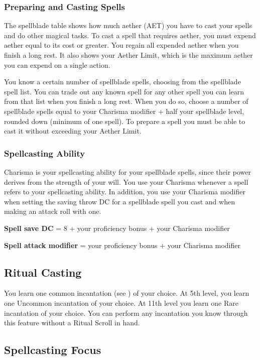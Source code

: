 \subsubsection{Preparing and Casting Spells}

The spellblade table shows how much aether (AET) you have to cast your spells and do other magical tasks. To cast a spell that requires aether, you must expend aether equal to its cost or greater. You regain all expended aether when you finish a long rest. It also shows your Aether Limit, which is the maximum aether you can expend on a single action.

You know a certain number of spellblade spells, choosing from the spellblade spell list. You can trade out any known spell for any other spell you can learn from that list when you finish a long rest. When you do so, choose a number of spellblade spells equal to your Charisma modifier + half your spellblade level, rounded down (minimum of one spell). To prepare a spell you must be able to cast it without exceeding your Aether Limit.

\subsubsection{Spellcasting Ability}

Charisma is your spellcasting ability for your spellblade spells, since their power derives from the strength of your will. You use your Charisma whenever a spell refers to your spellcasting ability. In addition, you use your Charisma modifier when setting the saving throw DC for a spellblade spell you cast and when making an attack roll with one.

\textbf{Spell save DC} = 8 + your proficiency bonus + your Charisma modifier

\textbf{Spell attack modifier} = your proficiency bonus + your Charisma modifier

\subsection{Ritual Casting}

You learn one common incantation (see ) of your choice. At 5th level, you learn one Uncommon incantation of your choice. At 11th level you learn one Rare incantation of your choice. You can perform any incantation you know through this feature without a Ritual Scroll in hand.

\subsection{Spellcasting Focus}


